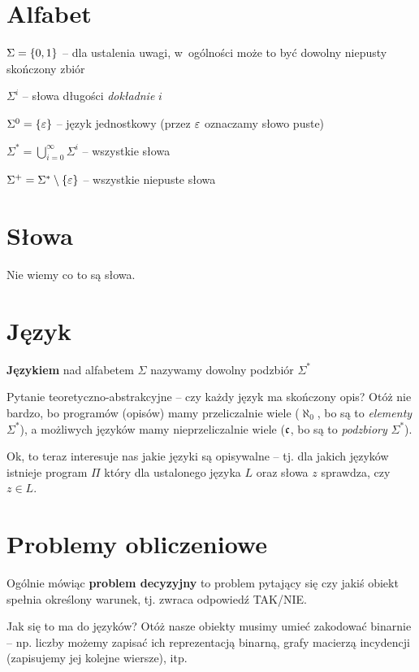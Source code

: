 \section{Alfabet}
\begin{description}
    \item \( \Sigma = \set{0, 1} \) -- dla ustalenia uwagi, w~ogólności może to być dowolny niepusty skończony zbiór
    \item \( \Sigma^i \) -- słowa długości \emph{dokładnie} \( i \)
    \item \( \Sigma^0 = \set{\eps} \) -- język jednostkowy (przez \(\varepsilon\) oznaczamy słowo puste)
    \item \( \Sigma^* = \bigcup_{i=0}^\infty \Sigma^i \) -- wszystkie słowa
    \item \( \Sigma^+ = \Sigma^* \setminus \set{\eps} \) -- wszystkie niepuste słowa
\end{description}

\section{Słowa}
Nie wiemy co to są słowa.

\section{Język}
\begin{definition}[Język]
    \textbf{Językiem} nad alfabetem \( \Sigma \) nazywamy dowolny podzbiór \( \Sigma^* \)
\end{definition}

Pytanie teoretyczno-abstrakcyjne -- czy każdy język ma skończony opis? 
Otóż nie bardzo, bo programów (opisów) mamy przeliczalnie wiele (\(\aleph_0\), bo są to \emph{elementy} \(\Sigma^*\)), a możliwych języków mamy nieprzeliczalnie wiele (\(\mathfrak{c}\), bo są to \emph{podzbiory} \(\Sigma^*\)).

Ok, to teraz interesuje nas jakie języki są opisywalne -- tj. dla jakich języków istnieje program \( \Pi \) który dla ustalonego języka \( L \) oraz słowa \( z \) sprawdza, czy \( z \in L \).

\section{Problemy obliczeniowe}
Ogólnie mówiąc \textbf{problem decyzyjny} to problem pytający się czy jakiś obiekt spełnia określony warunek, tj. zwraca odpowiedź TAK/NIE.

Jak się to ma do języków?
Otóż nasze obiekty musimy umieć zakodować binarnie -- np. liczby możemy zapisać ich reprezentacją binarną, grafy macierzą incydencji (zapisujemy jej kolejne wiersze), itp.

